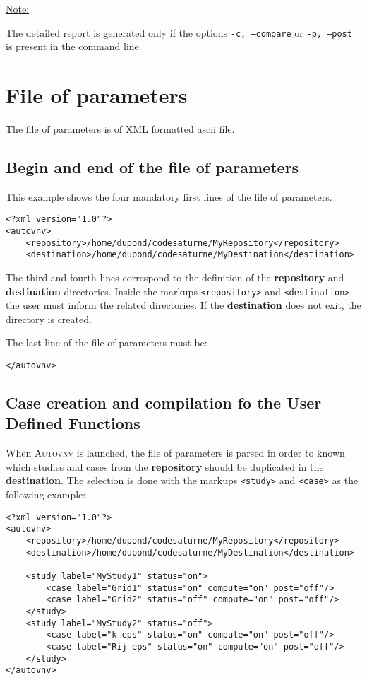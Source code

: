 \documentclass[a4paper,10pt,twoside]{article}
\begin{document}
\underline{Note:}

The detailed report is generated only if the options \texttt{-c, --compare}
or \texttt{-p, --post} is present in the command line.

\section{File of parameters}

The file of parameters is of XML formatted ascii file.

\subsection{Begin and end of the file of parameters}

This example shows the four mandatory first lines of the file of parameters.

\begin{verbatim}
<?xml version="1.0"?>
<autovnv>
    <repository>/home/dupond/codesaturne/MyRepository</repository>
    <destination>/home/dupond/codesaturne/MyDestination</destination>
\end{verbatim}


The third and fourth lines correspond to the definition of the \textbf{repository}
and \textbf{destination} directories.
Inside the markups \texttt{<repository>} and \texttt{<destination>} the user
must inform the related directories. If the \textbf{destination} does not exit,
the directory is created.

The last line of the file of parameters must be:

\begin{verbatim}
</autovnv>
\end{verbatim}

\subsection{Case creation and compilation fo the User Defined Functions}

When \textsc{Autovnv} is launched, the file of parameters is parsed in order to known
which studies and cases from the \textbf{repository} should be duplicated in
the \textbf{destination}. The selection is done with the markups \texttt{<study>}
and \texttt{<case>} as the following example:

\begin{verbatim}
<?xml version="1.0"?>
<autovnv>
    <repository>/home/dupond/codesaturne/MyRepository</repository>
    <destination>/home/dupond/codesaturne/MyDestination</destination>

    <study label="MyStudy1" status="on">
        <case label="Grid1" status="on" compute="on" post="off"/>
        <case label="Grid2" status="off" compute="on" post="off"/>
    </study>
    <study label="MyStudy2" status="off">
        <case label="k-eps" status="on" compute="on" post="off"/>
        <case label="Rij-eps" status="on" compute="on" post="off"/>
    </study>
</autovnv>
\end{verbatim}
\end{document}
